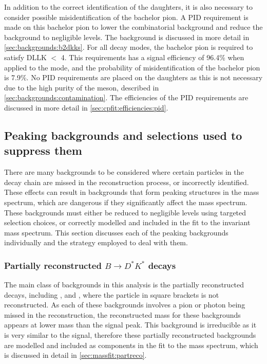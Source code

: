In addition to the correct identification of the \Dz daughters, it is also necessary to consider possible misidentification of the bachelor pion. A PID requirement is made on this bachelor pion to lower the combinatorial background and reduce the \decay{\Bm}{\D\KS\Km} background to negligible levels. The \decay{\Bm}{\D\KS\Km} background is discussed in more detail in \sect\ref{sec:backgrounds:b2dkks}. For all \Dz decay modes, the bachelor pion is required to satisfy DLLK $<$ 4. This requirements has a signal efficiency of 96.4\% when applied to the \kpi mode, and the probability of misidentification of the bachelor pion is 7.9\%. No PID requirements are placed on the \KS daughters as this is not necessary due to the high purity of the \KS meson, described in \sect\ref{sec:backgrounds:contamination}. The efficiencies of the PID requirements are discussed in more detail in \sect\ref{sec:cpfit:efficiencies:pid}.

\subsection{Peaking backgrounds and selections used to suppress them}
\label{sec:backgrounds}

There are many backgrounds to be considered where certain particles in the decay chain are missed in the reconstruction process, or incorrectly identified. These effects can result in backgrounds that form peaking structures in the \Bm mass spectrum, which are dangerous if they significantly affect the \Bm mass spectrum. These backgrounds must either be reduced to negligible levels using targeted selection choices, or correctly modelled and included in the fit to the invariant \Bm mass spectrum. This section discusses each of the peaking backgrounds individually and the strategy employed to deal with them.

\subsubsection{Partially reconstructed \boldmath$B \to D^*K^*$ decays}
\label{sec:backgrounds:partreco}

The main class of backgrounds in this analysis is the partially reconstructed \decay{\B}{\Dstar\Kstar} decays, including \decay{\Bm}{(\decay{\Dstarz}{\Dz[\piz]})\Kstarm}, \decay{\Bm}{(\decay{\Dstarz}{\Dz[\gamma]})\Kstarm} and \decay{\Bd}{(\decay{\Dstarp}{\Dz[\pip]})\Kstarm}, where the particle in square brackets is not reconstructed. As each of these backgrounds involves a pion or photon being missed in the reconstruction, the reconstructed \Bm mass for these backgrounds appears at lower mass than the signal peak. This background is irreducible as it is very similar to the signal, therefore these partially reconstructed backgrounds are modelled and included as components in the fit to the \Bm mass spectrum, which is discussed in detail in \sect\ref{sec:massfit:partreco}.

